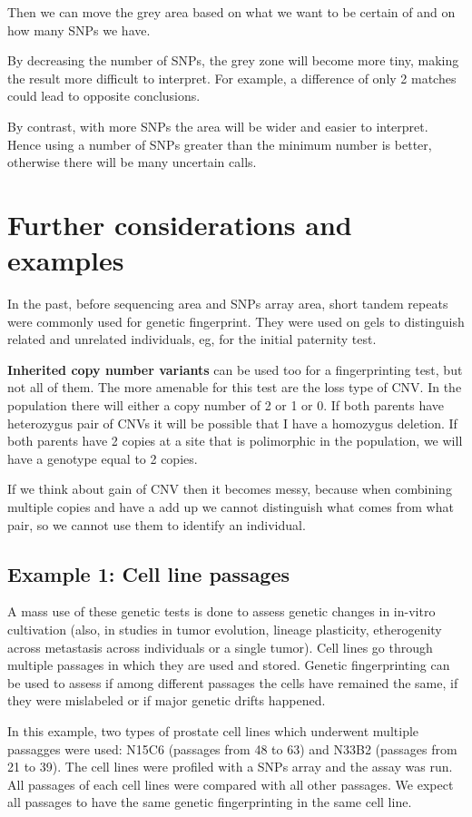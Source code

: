 Then we can move the grey area based on what we want to be certain of and on how
many SNPs we have.

By decreasing the number of SNPs, the grey zone will become more tiny, making
the result more difficult to interpret. For example, a difference of only 2
matches could lead to opposite conclusions. 

By contrast, with more SNPs the area will be wider and easier to interpret.
Hence using a number of SNPs greater than the minimum number is better,
otherwise there will be many uncertain calls. 


\section{Further considerations and examples}
In the past, before sequencing area and SNPs array area, short tandem repeats
were commonly used for genetic fingerprint. They were used on gels to
distinguish related and unrelated individuals, eg, for the initial paternity
test. 

\textbf{Inherited copy number variants} can be used too for a fingerprinting
test, but not all of them. The more amenable for this test are the loss type of
CNV. In the population there will either a copy number of 2 or 1 or 0. If both
parents have heterozygus pair of CNVs it will be possible that I have a
homozygus deletion. If both parents have 2 copies at a site that is polimorphic
in the population, we will have a genotype equal to 2 copies. 

If we think about gain of CNV then it becomes messy, because when combining
multiple copies and have a add up we cannot distinguish what comes from what
pair, so we cannot use them to identify an individual.


\subsection{Example 1: Cell line passages}

A mass use of these genetic tests is done to assess genetic changes in in-vitro
cultivation (also, in studies in tumor evolution, lineage plasticity,
etherogenity across metastasis across individuals or a single tumor). Cell lines
go through multiple passages in which they are used and stored. Genetic
fingerprinting can be used to assess if among different passages the cells have
remained the same, if they were mislabeled or if major genetic drifts happened.

In this example, two types of prostate cell lines which underwent multiple
passagges were used: N15C6 (passages from 48 to 63) and N33B2 (passages from 21
to 39). The cell lines were profiled with a SNPs array and the assay was run.
All passages of each cell lines were compared with all other passages. We expect
all passages to have the same genetic fingerprinting in the same cell line.  

